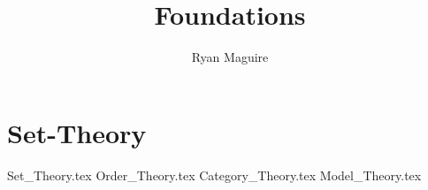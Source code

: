 \documentclass[crop=false,class=book,oneside]{standalone}
\begin{document}
    \ifx\ifmain\undefined
        \title{Foundations}
        \author{Ryan Maguire}
        \date{\vspace{-5ex}}
        \maketitle
        \tableofcontents
        \listoffigures
        \listoftables
        \clearpage
    \fi
    \newif\ifmain
    \part{Set-Theory}
        {Set_Theory.tex}
        {Order_Theory.tex}
        {Category_Theory.tex}
        {Model_Theory.tex}
\end{document}
